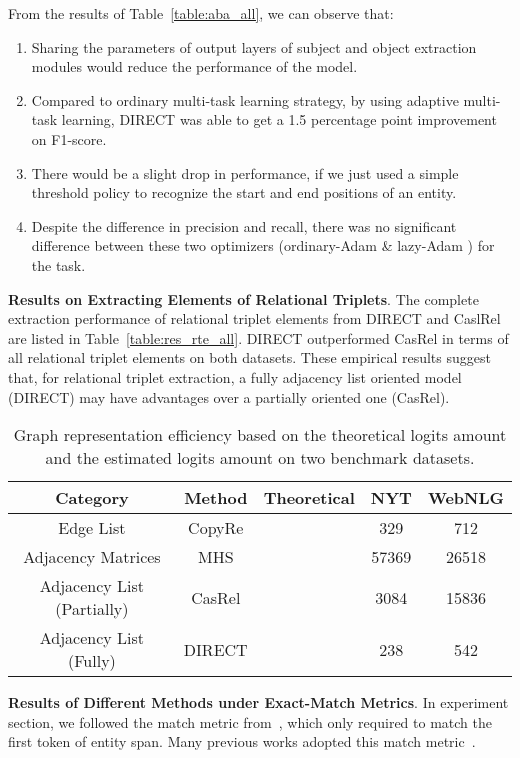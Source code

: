 \documentclass[11pt,a4paper]{article}
\begin{document}
From the results of Table~\ref{table:aba_all}, we can observe that:
\begin{enumerate}
\item Sharing the parameters of output layers of subject and object extraction modules would reduce the performance of the model.
\item Compared to ordinary multi-task learning strategy, by using adaptive multi-task learning, DIRECT was able to get a 1.5 percentage point improvement on F1-score.
\item There would be a slight drop in performance, if we just used a simple threshold policy to recognize the start and end positions of an entity.
\item Despite the difference in precision and recall, there was
 no significant difference between these two optimizers (ordinary-Adam \& lazy-Adam ) for the task.
\end{enumerate} 
 
\textbf{Results on Extracting Elements of Relational Triplets}. The complete extraction performance of relational triplet elements from DIRECT and CaslRel are listed in Table~\ref{table:res_rte_all}. DIRECT outperformed CasRel in terms of all relational triplet elements on both datasets. These empirical results suggest that, for relational triplet extraction, a fully adjacency list oriented model (DIRECT) may have advantages over a partially oriented one (CasRel).

\begin{table*}[htbp]
\centering
\begin{tabular}{ccccc}
\toprule[1pt]
Category & Method & Theoretical & NYT & WebNLG\\
\hline
Edge List & CopyRe &  & 329 & 712 \\
Adjacency Matrices & MHS && 57369 & 26518 \\
Adjacency List (Partially)& CasRel &  & 3084 & 15836 \\
\hline
Adjacency List (Fully)& DIRECT &  & 238 & 542 \\
\bottomrule[1pt]
\end{tabular}
\caption{Graph representation efficiency based on the theoretical logits amount and the estimated logits amount on two benchmark datasets.}
\label{tab:logit1_all}
\end{table*}

\textbf{Results of Different Methods under Exact-Match Metrics}. In experiment section, we followed the match metric from~\cite{zeng2018extracting}, which only required to match the first token of entity span. Many previous works adopted this match metric~\cite{fu2019graphrel,zeng2019learning,wei2020novel}. 
\end{document}
